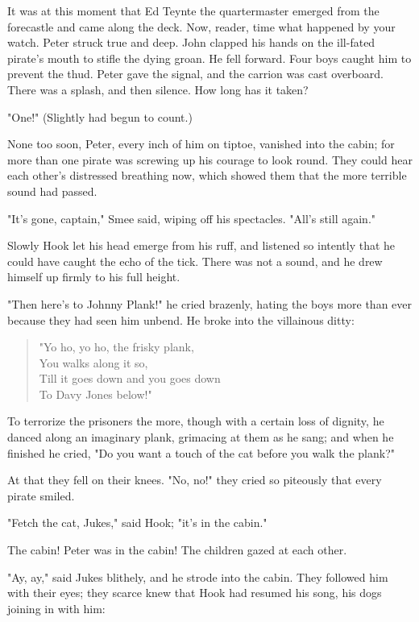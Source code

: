 It was at this moment that Ed Teynte the quartermaster emerged from the forecastle and came along the deck.
Now, reader, time what happened by your watch.
Peter struck true and deep.
John clapped his hands on the ill-fated pirate's mouth to stifle the dying groan.
He fell forward.
Four boys caught him to prevent the thud.
Peter gave the signal, and the carrion was cast overboard.
There was a splash, and then silence.
How long has it taken?

"One!"
(Slightly had begun to count.)

None too soon, Peter, every inch of him on tiptoe, vanished into the cabin;
for more than one pirate was screwing up his courage to look round.
They could hear each other's distressed breathing now, which showed them that the more terrible sound had passed.

"It's gone, captain," Smee said, wiping off his spectacles.
"All's still again."

Slowly Hook let his head emerge from his ruff, and listened so intently that he could have caught the echo of the tick.
There was not a sound, and he drew himself up firmly to his full height.

"Then here's to Johnny Plank!\@" he cried brazenly, hating the boys more than ever because they had seen him unbend.
He broke into the villainous ditty:

\begin{verse}
	"Yo ho, yo ho, the frisky plank,\\
	You walks along it so,\\
	Till it goes down and you goes down\\
	To Davy Jones below!"
\end{verse}

To terrorize the prisoners the more, though with a certain loss of dignity, he danced along an imaginary plank, grimacing at them as he sang;
and when he finished he cried, "Do you want a touch of the cat before you walk the plank?"

At that they fell on their knees.
"No, no!\@" they cried so piteously that every pirate smiled.

"Fetch the cat, Jukes," said Hook;
"it's in the cabin."

The cabin!
Peter was in the cabin!
The children gazed at each other.

"Ay, ay," said Jukes blithely, and he strode into the cabin.
They followed him with their eyes;
they scarce knew that Hook had resumed his song, his dogs joining in with him:

